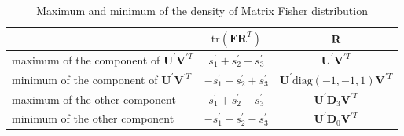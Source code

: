 \documentclass[12pt]{article}
\begin{document}
\begin{table}
	\centering
	\caption{Maximum and minimum of the density of Matrix Fisher distribution}
	\label{tab:MaxMin}
	\begin{tabular}{|l|c|c|}
		\hline
		 & $\mathrm{tr}(\mathbf{F}\mathbf{R}^T)$ & $\mathbf{R}$ \\ \hline
		maximum of the component of $\mathbf{U}^\prime\mathbf{V}^{\prime T}$ & $s^\prime_1+s^\prime_2+s^\prime_3$ & $\mathbf{U}^\prime\mathbf{V}^{\prime T}$ \\ \hline
		minimum of the component of $\mathbf{U}^\prime\mathbf{V}^{\prime T}$ & $-s^\prime_1-s^\prime_2+s^\prime_3$ & $\mathbf{U}^\prime\mathrm{diag}(-1,-1,1)\mathbf{V}^{\prime T}$ \\ \hline
		maximum of the other component & $s^\prime_1+s^\prime_2-s^\prime_3$ & $\mathbf{U}^\prime\mathbf{D}_3\mathbf{V}^{\prime T}$ \\ \hline
		minimum of the other component & $-s^\prime_1-s^\prime_2-s^\prime_3$ & $\mathbf{U}^\prime\mathbf{D}_0\mathbf{V}^{\prime T}$ \\ \hline
	\end{tabular}
\end{table}
\end{document}
